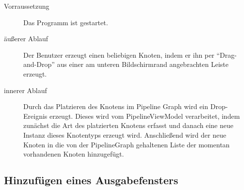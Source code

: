 \begin{description}
	\item[Vorraussetzung] Das Programm ist gestartet.
	\item[äußerer Ablauf] Der Benutzer erzeugt einen beliebigen Knoten, indem er ihn per ``Drag-and-Drop'' aus einer am unteren Bildschirmrand angebrachten Leiste erzeugt.
	\item[innerer Ablauf] Durch das Platzieren des Knotens im Pipeline Graph wird ein Drop-Ereignis erzeugt. Dieses wird vom PipelineViewModel verarbeitet, indem zunächst die Art des platzierten Knotens erfasst und danach eine neue Instanz dieses Knotentyps erzeugt wird. Anschließend wird der neue Knoten in die von der PipelineGraph gehaltenen Liste der momentan vorhandenen Knoten hinzugefügt.
\end{description}
\newpage
\subsection{Hinzufügen eines Ausgabefensters}
